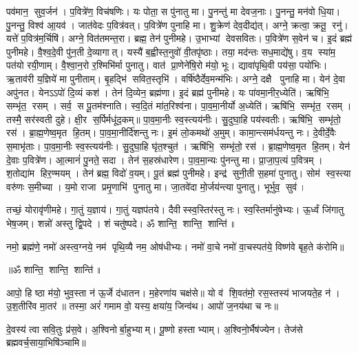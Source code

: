 पव॑मान॒ सुव॒र्जन॑। प॒वित्रे॑ण॒ विच॑\ur{}षणिः। यः पोता॒ स पु॑नातु मा। पु॒नन्तु॑ मा देवज॒नाः।
पु॒नन्तु॒ मन॑वो धि॒या। पु॒नन्तु॒ विश्व॑ आ॒यव॑। जात॑वेदः प॒वित्र॑वत्। प॒वित्रे॑ण पुनाहि मा।
शु॒क्रेण॑ देव॒दीद्य॑त्। अग्ने॒ क्रत्वा॒ क्रतू॒ रनु॑। यत्ते॑ प॒वित्र॑म॒र्चिषि॑। अग्ने॒ वित॑तमन्त॒रा।
ब्रह्म॒ तेन॑ पुनीमहे। उ॒भाभ्यां देवसवितः। प॒वित्रे॑ण स॒वेन॑ च। इ॒दं ब्रह्म॑ पुनीमहे।
वै॒श्व॒दे॒वी पु॑न॒ती दे॒व्यागात्। यस्यै॑ ब॒ह्वीस्त॒नुवो॑ वी॒तपृ॑ष्ठाः।
तया॒ मद॑न्तः सध॒माद्ये॑षु। व॒य स्या॑म॒ पत॑यो रयी॒णाम्।
वै॒श्वा॒न॒रो र॒श्मिभि॑र्मा पुनातु। वात॑ प्रा॒णेने॑षि॒रो म॑यो॒ भूः।
द्यावा॑पृथि॒वी पय॑सा॒ पयो॑भिः। ऋ॒ताव॑री य॒ज्ञिये॑ मा पुनीताम्।
बृ॒हद्भि॑ सवित॒स्तृभि॑। वर्{}षि॑ष्ठैर्देव॒मन्म॑भिः।
अग्ने॒ दक्षै पुनाहि मा। येन॑ दे॒वा अपु॑नत।
येनऽऽपो॑ दि॒व्यं कश॑। तेन॑ दि॒व्येन॒ ब्रह्म॑णा। इ॒दं ब्रह्म॑ पुनीमहे। यः पा॑वमा॒नीर॒ध्येति॑।
ऋषि॑भि॒ सम्भृ॑त॒ रसम्। सर्व॒ स पू॒तम॑श्नाति।
स्व॒दि॒तं मा॑त॒रिश्व॑ना। पा॒व॒मा॒नीर्यो अ॒ध्येति॑।
ऋषि॑भि॒ सम्भृ॑त॒ रसम्। तस्मै॒ सर॑स्वती दुहे। क्षी॒र स॒र्पिर्मधू॑द॒कम्॥
पा॒व॒मा॒नीः स्व॒स्त्यय॑नीः। सु॒दुघा॒हि पय॑स्वतीः।
ऋषि॑भि॒ सम्भृ॑तो॒ रस॑। ब्रा॒ह्म॒णेष्व॒मृत हि॒तम्।
पा॒व॒मा॒नीर्दि॑शन्तु नः। इ॒मं लो॒कमथो॑ अ॒मुम्।
कामा॒न्त्सम॑र्धयन्तु नः। दे॒वीर्दे॒वैः स॒माभृ॑ताः।
पा॒व॒मा॒नीः स्व॒स्त्यय॑नीः। सु॒दुघा॒हि घृ॑त॒श्चुत॑।
ऋषि॑भि॒ सम्भृ॑तो॒ रस॑। ब्रा॒ह्म॒णेष्व॒मृत हि॒तम्।
येन॑ दे॒वाः प॒वित्रे॑ण। आ॒त्मानं॑ पु॒नते॒ सदा।
तेन॑ स॒हस्र॑धारेण। पा॒व॒मा॒न्यः पु॑नन्तु मा।
प्रा॒जा॒प॒त्यं प॒वित्रम्। श॒तोद्या॑म हिर॒ण्मयम्।
तेन॑ ब्रह्म॒ विदो॑ व॒यम्। पू॒तं ब्रह्म॑ पुनीमहे।
इन्द्र॑ सुनी॒ती स॒हमा॑ पुनातु। सोम॑ स्व॒स्त्या वरु॑णः स॒मीच्या।
य॒मो राजा प्रमृ॒णाभि॑ पुनातु मा। जा॒तवे॑दा मो॒र्जय॑न्त्या पुनातु। भूर्भुव॒ सुव॑।

तच्छं॒ योरावृ॑णीमहे। गा॒तुं य॒ज्ञाय॑।
गा॒तुं यज्ञप॑तये। दैवीस्स्व॒स्तिर॑स्तु नः।
स्व॒स्तिर्मानु॑षेभ्यः। ऊ॒र्ध्वं जि॑गातु भेष॒जम्।
शन्नो॑ अस्तु द्वि॒पदे। शं चतु॑ष्पदे।
ॐ शान्ति॒ शान्ति॒ शान्ति॑॥

नमो॒ ब्रह्म॑णे॒ नमो॑ अस्त्व॒ग्नये॒ नम॑ पृथि॒व्यै नम॒ ओष॑धीभ्यः।
नमो॑ वा॒चे नमो॑ वा॒चस्पत॑ये॒ विष्ण॑वे बृह॒ते क॑रोमि॥

\centerline{॥ॐ शान्ति॒ शान्ति॒ शान्ति॑॥}


आपो॒ हि ष्ठा म॑यो॒ भुव॒स्ता न॑ ऊ॒र्जे द॑धातन। म॒हेरणा॑य चक्ष॑से॥
यो व॑ शि॒वत॑मो॒ रस॒स्तस्य॑ भाजयते॒ह न॑। उ॒श॒तीरि॑व मा॒तर॑॥
तस्मा॒ अरं॑ गमाम वो॒ यस्य॒ क्षया॑य॒ जिन्व॑थ। आपो॑ ज॒नय॑था च नः॥

दे॒वस्य॑ त्वा सवि॒तुः प्र॑स॒वे। अ॒श्विनोर्बा॒हुभ्याम्। पू॒ष्णो हस्ताभ्याम्।
अ॒श्विनो॒र्भैष॑ज्येन। तेज॑से ब्रह्मवर्च॒साया॒भिषि॑ञ्चामि॥


